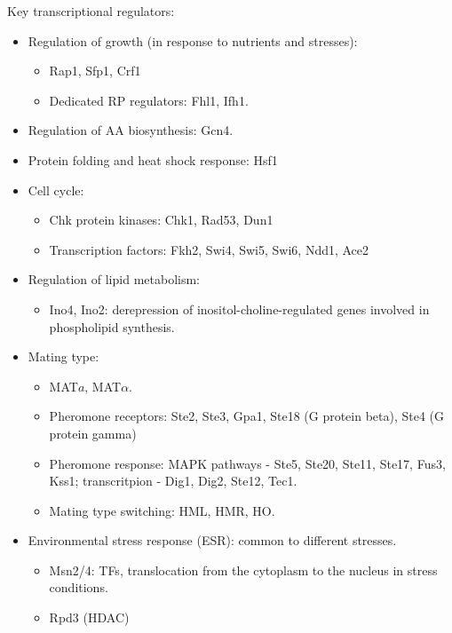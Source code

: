 \documentclass{report}
\begin{document}
Key transcriptional regulators: 
\begin{itemize}
\item Regulation of growth (in response to nutrients and stresses): 
\begin{itemize}
	\item Rap1, Sfp1, Crf1
	\item Dedicated RP regulators: Fhl1, Ifh1. 
\end{itemize}

\item Regulation of AA biosynthesis: Gcn4. 

\item Protein folding and heat shock response: Hsf1	

\item Cell cycle: 
\begin{itemize}
	\item Chk protein kinases: Chk1, Rad53, Dun1
	\item Transcription factors: Fkh2, Swi4, Swi5, Swi6, Ndd1, Ace2
\end{itemize}

\item Regulation of lipid metabolism: 
\begin{itemize}
	\item Ino4, Ino2: derepression of inositol-choline-regulated genes involved in phospholipid synthesis. 
\end{itemize}

\item Mating type: 
\begin{itemize}
	\item MAT$a$, MAT$\alpha$. 
	\item Pheromone receptors: Ste2, Ste3, Gpa1, Ste18 (G protein beta), Ste4 (G protein gamma)
	\item Pheromone response: MAPK pathways - Ste5, Ste20, Ste11, Ste17, Fus3, Kss1; transcritpion - Dig1, Dig2, Ste12, Tec1. 
	\item Mating type switching: HML, HMR, HO. 
\end{itemize}

\item Environmental stress response (ESR): common to different stresses. 
\begin{itemize}
	\item Msn2/4: TFs, translocation from the cytoplasm to the nucleus in stress conditions. 
	\item Rpd3 (HDAC)
\end{itemize}


\end{itemize}
\end{document}
